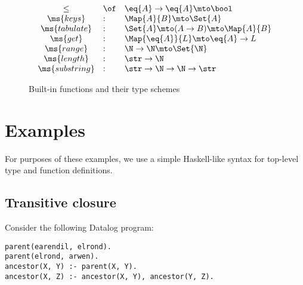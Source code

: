\documentclass[preprint]{sigplanconf}
\newcommand{\uto}{\to}
\begin{document}
\newcommand{\fname}{\ms}
\begin{figure}
  \[\begin{array}{cll}
  \le &\of& \eq{A} \uto \eq{A} \mto \bool\\
  \fname{keys}     &:& \Map{A}{B} \mto \Set{A}\\
  \fname{tabulate} &:& \Set{A} \mto (A \to B) \mto \Map{A}{B}\\
  \fname{get}      &:& \Map{\eq{A}}{L} \mto \eq{A} \uto L\\
  \fname{range}    &:& \N \uto \N \mto \Set{\N}\\
  \fname{length}   &:& \str \uto \N\\
  \fname{substring} &:& \str \uto \N \uto \N \uto \str
  \end{array}\]
  \caption{Built-in functions and their type schemes}
\end{figure}


\pagebreak
\section{Examples}

For purposes of these examples, we use a simple Haskell-like syntax for
top-level type and function definitions.



\subsection{Transitive closure}

Consider the following Datalog program:
\begin{verbatim}
parent(earendil, elrond).
parent(elrond, arwen).
ancestor(X, Y) :- parent(X, Y).
ancestor(X, Z) :- ancestor(X, Y), ancestor(Y, Z).
\end{verbatim}
\end{document}
